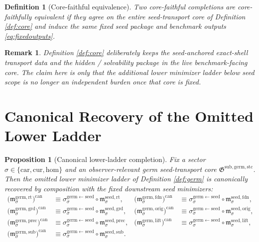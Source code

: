 \documentclass[11pt]{article}
\newcommand{\Car}{\mathrm{car}}
\newcommand{\Cur}{\mathrm{cur}}
\newcommand{\Hom}{\mathrm{hom}}
\newcommand{\SeedRootMin}[1]{\mathfrak m_{#1}^{\mathrm{seed,rt}}}
\newcommand{\SeedFoundMin}[1]{\mathfrak m_{#1}^{\mathrm{seed,fdn}}}
\newcommand{\SeedGroundMin}[1]{\mathfrak m_{#1}^{\mathrm{seed,grd}}}
\newcommand{\SeedOrigMin}[1]{\mathfrak m_{#1}^{\mathrm{seed,orig}}}
\newcommand{\SeedPrecMin}[1]{\mathfrak m_{#1}^{\mathrm{seed,prec}}}
\newcommand{\SeedLiftMin}[1]{\mathfrak m_{#1}^{\mathrm{seed,lift}}}
\newcommand{\SeedSubMin}[1]{\mathfrak m_{#1}^{\mathrm{seed,sub}}}
\newcommand{\GermTransportCore}{\mathfrak G^{\mathrm{sub,germ,stc}}}
\newcommand{\GermSeedSec}[1]{\sigma_{#1}^{\mathrm{germ\leftarrow seed}}}
\newcommand{\GermRootMin}[1]{\mathfrak m_{#1}^{\mathrm{germ,rt}}}
\newcommand{\GermFoundMin}[1]{\mathfrak m_{#1}^{\mathrm{germ,fdn}}}
\newcommand{\GermGroundMin}[1]{\mathfrak m_{#1}^{\mathrm{germ,grd}}}
\newcommand{\GermOrigMin}[1]{\mathfrak m_{#1}^{\mathrm{germ,orig}}}
\newcommand{\GermPrecMin}[1]{\mathfrak m_{#1}^{\mathrm{germ,prec}}}
\newcommand{\GermLiftMin}[1]{\mathfrak m_{#1}^{\mathrm{germ,lift}}}
\newcommand{\GermSubMin}[1]{\mathfrak m_{#1}^{\mathrm{germ,sub}}}
\newtheorem{definition}{Definition}
\newtheorem{proposition}{Proposition}
\newtheorem{remark}{Remark}
\begin{document}
\begin{definition}[Core-faithful equivalence]
\label{def:equiv}
Two core-faithful completions are \emph{core-faithfully equivalent} if they agree on the entire seed-transport core of Definition \ref{def:core} and induce the same fixed seed package and benchmark outputs \eqref{eq:fixedoutputs}.
\end{definition}

\begin{remark}
Definition \ref{def:core} deliberately keeps the seed-anchored exact-shell transport data and the hidden / solvability package in the live benchmark-facing core. The claim here is only that the additional lower minimizer ladder below seed scope is no longer an independent burden once that core is fixed.
\end{remark}

\section{Canonical Recovery of the Omitted Lower Ladder}

\begin{proposition}[Canonical lower-ladder completion]
\label{prop:canonical}
Fix a sector \(\sigma\in\{\Car,\Cur,\Hom\}\) and an observer-relevant germ seed-transport core \(\GermTransportCore\). Then the omitted lower minimizer ladder of Definition \ref{def:germ} is canonically recovered by composition with the fixed downstream seed minimizers:
\begin{align*}
\bigl(\GermRootMin{\sigma}\bigr)^{\mathrm{can}}
&\equiv
\GermSeedSec{\sigma}\circ\SeedRootMin{\sigma},
&
\bigl(\GermFoundMin{\sigma}\bigr)^{\mathrm{can}}
&\equiv
\GermSeedSec{\sigma}\circ\SeedFoundMin{\sigma},
\\
\bigl(\GermGroundMin{\sigma}\bigr)^{\mathrm{can}}
&\equiv
\GermSeedSec{\sigma}\circ\SeedGroundMin{\sigma},
&
\bigl(\GermOrigMin{\sigma}\bigr)^{\mathrm{can}}
&\equiv
\GermSeedSec{\sigma}\circ\SeedOrigMin{\sigma},
\\
\bigl(\GermPrecMin{\sigma}\bigr)^{\mathrm{can}}
&\equiv
\GermSeedSec{\sigma}\circ\SeedPrecMin{\sigma},
&
\bigl(\GermLiftMin{\sigma}\bigr)^{\mathrm{can}}
&\equiv
\GermSeedSec{\sigma}\circ\SeedLiftMin{\sigma},
\\
\bigl(\GermSubMin{\sigma}\bigr)^{\mathrm{can}}
&\equiv
\GermSeedSec{\sigma}\circ\SeedSubMin{\sigma}.
\end{align*}
\end{proposition}
\end{document}
